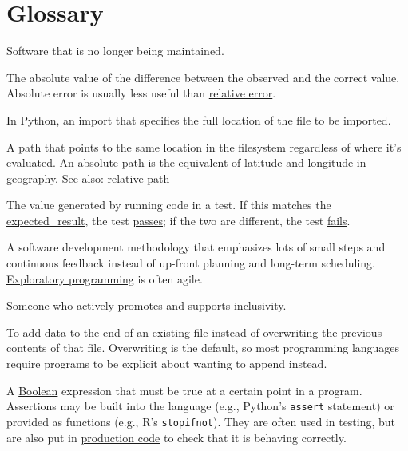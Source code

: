 \documentclass[
]{krantz}
\providecommand{\tightlist}{%
  \setlength{\itemsep}{0pt}\setlength{\parskip}{0pt}}
\begin{document}
\hypertarget{appendix-appendix}{%
\appendix {}}


\hypertarget{glossary}{%
\chapter{Glossary}\label{glossary}}

\begin{description}
\tightlist
\item[\textbf{abandonware}]
Software that is no longer being maintained.
\item[\textbf{absolute error}]
The absolute value of the difference between the observed and the correct value. Absolute error is usually less useful than \protect\hyperlink{relative_error}{relative error}.
\item[\textbf{absolute import}]
In Python, an import that specifies the full location of the file to be imported.
\item[\textbf{absolute path}]
A path that points to the same location in the filesystem regardless of where it's evaluated. An absolute path is the equivalent of latitude and longitude in geography. See also: \protect\hyperlink{relative_path}{relative path}
\item[\textbf{actual result (of test)}]
The value generated by running code in a test. If this matches the \protect\hyperlink{expected_result}{expected\_result}, the test \protect\hyperlink{pass_test}{passes}; if the two are different, the test \protect\hyperlink{fail_test}{fails}.
\item[\textbf{agile development}]
A software development methodology that emphasizes lots of small steps and continuous feedback instead of up-front planning and long-term scheduling. \protect\hyperlink{exploratory_programming}{Exploratory programming} is often agile.
\item[\textbf{ally}]
Someone who actively promotes and supports inclusivity.
\item[\textbf{append mode}]
To add data to the end of an existing file instead of overwriting the previous contents of that file. Overwriting is the default, so most programming languages require programs to be explicit about wanting to append instead.
\item[\textbf{assertion}]
A \protect\hyperlink{boolean}{Boolean} expression that must be true at a certain point in a program. Assertions may be built into the language (e.g., Python's \texttt{assert} statement) or provided as functions (e.g., R's \texttt{stopifnot}). They are often used in testing, but are also put in \protect\hyperlink{production_code}{production code} to check that it is behaving correctly.

\end{description}
\end{document}
